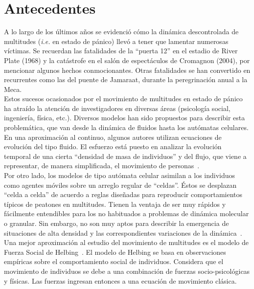 \section{Antecedentes}

A lo largo de los últimos años se evidenció cómo la dinámica descontrolada de multitudes (\emph{i.e.} en estado de pánico) llevó a tener que lamentar numerosas víctimas. Se recuerdan las fatalidades  de  la “puerta 12” en el estadio de River Plate (1968) y la catástrofe en el salón de espectáculos de Cromagnon (2004), por mencionar algunos hechos conmocionantes. Otras fatalidades se han convertido en recurrentes como las del puente de Jamaraat, durante la peregrinación anual a la  Meca. \\   

\noindent Estos sucesos ocasionados por el movimiento de multitudes en estado de pánico ha atraído la atención de investigadores en diversas áreas (psicología social, ingeniería, física, etc.). Diversos modelos han sido propuestos para describir esta problemática, que van desde la dinámica de fluidos hasta los autómatas celulares.\\

\noindent En una aproximación al continuo, algunos autores utilizan ecuaciones de evolución del tipo fluido.  El esfuerzo está puesto en analizar la evolución temporal de una cierta “densidad de masa de individuos” y del  flujo, que viene a representar, de manera simplificada, el movimiento de personas~\cite{bruno}. \\

\noindent Por otro lado, los modelos de tipo autómata celular asimilan a los individuos como agentes móviles sobre un arreglo regular de “celdas”. Éstos se desplazan “celda a celda” de acuerdo a reglas diseñadas para reproducir comportamientos típicos de peatones en multitudes. Tienen la ventaja de ser muy rápidos y fácilmente entendibles para los no habituados a problemas de dinámica molecular o granular. Sin embargo, no son muy aptos para describir la emergencia de situaciones de alta densidad y las correspondientes variaciones de la dinámica~\cite{blue}.\\

\noindent Una mejor aproximación al estudio del movimiento de multitudes es el modelo de Fuerza Social de Helbing~\cite{Helbing1}. El modelo de Helbing se basa en observaciones empíricas sobre el comportamiento social de individuos. Considera que el movimiento de individuos se debe a una combinación de fuerzas socio-psicológicas y físicas. Las fuerzas ingresan entonces a una ecuación de movimiento clásica. \\

